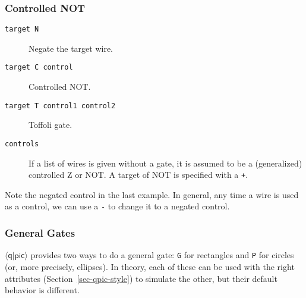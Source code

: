 \documentclass[twoside,12pt]{article}
\newcommand{\qpic}{$\langle\mathsf{q}|\mathsf{pic}\rangle$\xspace}
\begin{document}
\subsubsection{Controlled NOT}

\begin{description}
\item[{\tt target N}] Negate the target wire.

\begin{minipage}[b]{2in}

\end{minipage} \hfill 

\item[{\tt target C control}] Controlled NOT.

\begin{minipage}[b]{2in}

\end{minipage} \hfill 

\item[{\tt target T control1 control2}] Toffoli gate.

\begin{minipage}[b]{2in}

\end{minipage} \hfill 

\item[{\tt controls}]  If a list of wires is given without a gate, it is assumed to be a (generalized) controlled Z or NOT.  A target of NOT is specified
  with a {\tt +}.

\begin{minipage}[b]{2in}

\end{minipage} \hfill 
\end{description}

Note the negated control in the last example.  In general, any time a wire is
used as a control, we can use a {\tt -} to change it to a negated control.

\subsubsection{General Gates}

\qpic provides two ways to do a general gate: {\tt G} for rectangles and
{\tt P} for circles (or, more precisely, ellipses).  In theory, each of these
can be used with the right attributes (Section~\ref{sec-qpic-style}) to
simulate the other, but their default behavior is different.
      
\end{document}
